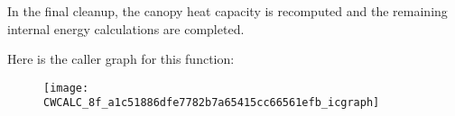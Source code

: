 In the final cleanup, the canopy heat capacity is recomputed and the remaining internal energy calculations are completed.

Here is the caller graph for this function\+:\nopagebreak
\begin{figure}[H]
\begin{center}
\leavevmode
\texttt{[image: CWCALC\_8f\_a1c51886dfe7782b7a65415cc66561efb\_icgraph]}
\end{center}
\end{figure}


